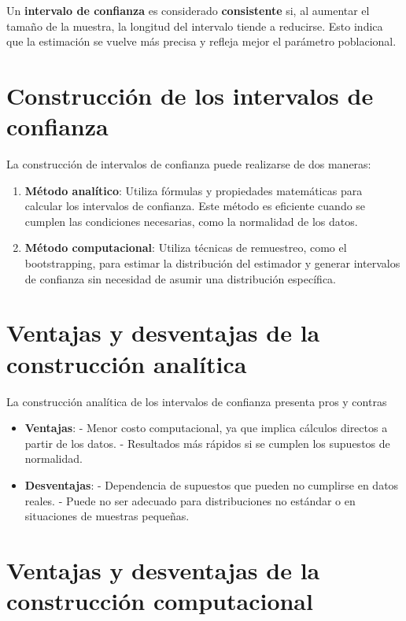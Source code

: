 \documentclass[
  letterpaper,
  DIV=11,
  numbers=noendperiod]{scrreprt}
\begin{document}
Un \textbf{intervalo de confianza} es considerado \textbf{consistente}
si, al aumentar el tamaño de la muestra, la longitud del intervalo
tiende a reducirse. Esto indica que la estimación se vuelve más precisa
y refleja mejor el parámetro poblacional.

\section{Construcción de los intervalos de
confianza}\label{construcciuxf3n-de-los-intervalos-de-confianza}

La construcción de intervalos de confianza puede realizarse de dos
maneras:

\begin{enumerate}
\def\labelenumi{\arabic{enumi}.}
\item
  \textbf{Método analítico}: Utiliza fórmulas y propiedades matemáticas
  para calcular los intervalos de confianza. Este método es eficiente
  cuando se cumplen las condiciones necesarias, como la normalidad de
  los datos.
\item
  \textbf{Método computacional}: Utiliza técnicas de remuestreo, como el
  bootstrapping, para estimar la distribución del estimador y generar
  intervalos de confianza sin necesidad de asumir una distribución
  específica.
\end{enumerate}

\section{Ventajas y desventajas de la construcción
analítica}\label{ventajas-y-desventajas-de-la-construcciuxf3n-analuxedtica}

La construcción analítica de los intervalos de confianza presenta pros y
contras

\begin{itemize}
\item
  \textbf{Ventajas}: - Menor costo computacional, ya que implica
  cálculos directos a partir de los datos. - Resultados más rápidos si
  se cumplen los supuestos de normalidad.
\item
  \textbf{Desventajas}: - Dependencia de supuestos que pueden no
  cumplirse en datos reales. - Puede no ser adecuado para distribuciones
  no estándar o en situaciones de muestras pequeñas.
\end{itemize}

\section{Ventajas y desventajas de la construcción
computacional}\label{ventajas-y-desventajas-de-la-construcciuxf3n-computacional}
\end{document}
